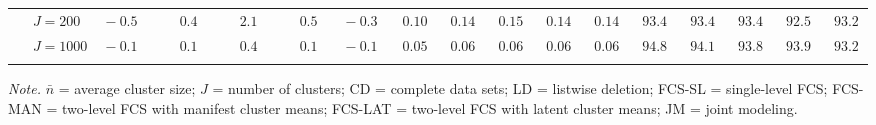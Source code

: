 \begin{sidewaystable}
\begin{threeparttable}
\begin{tabular}{llccccccccccccccc}
 & \nopagebreak $\;J=200$  & $\phantom{0}{-}0.5\phantom{0}$ & $\phantom{0}\phantom{-}0.4\phantom{0}$ & $\phantom{0}\phantom{-}2.1\phantom{0}$ & $\phantom{0}\phantom{-}0.5\phantom{0}$ & $\phantom{0}{-}0.3\phantom{0}$ & $\phantom{0}0.10\phantom{0}$ & $\phantom{0}0.14\phantom{0}$ & $\phantom{0}0.15\phantom{0}$ & $\phantom{0}0.14\phantom{0}$ & $\phantom{0}0.14\phantom{0}$ & $\phantom{0}93.4\phantom{0}$ & $\phantom{0}93.4\phantom{0}$ & $\phantom{0}93.4\phantom{0}$ & $\phantom{0}92.5\phantom{0}$ & $\phantom{0}93.2\phantom{0}$ \\
 & \nopagebreak $\;J=1000$  & $\phantom{0}{-}0.1\phantom{0}$ & $\phantom{0}\phantom{-}0.1\phantom{0}$ & $\phantom{0}\phantom{-}0.4\phantom{0}$ & $\phantom{0}\phantom{-}0.1\phantom{0}$ & $\phantom{0}{-}0.1\phantom{0}$ & $\phantom{0}0.05\phantom{0}$ & $\phantom{0}0.06\phantom{0}$ & $\phantom{0}0.06\phantom{0}$ & $\phantom{0}0.06\phantom{0}$ & $\phantom{0}0.06\phantom{0}$ & $\phantom{0}94.8\phantom{0}$ & $\phantom{0}94.1\phantom{0}$ & $\phantom{0}93.8\phantom{0}$ & $\phantom{0}93.9\phantom{0}$ & $\phantom{0}93.2\phantom{0}$ \\
[0.5ex]\hline\\[-1.6ex] 
\end{tabular}
\begin{tablenotes}{\footnotesize \textit{Note.} $\bar{n}$ = average cluster size; $J$ = number of clusters; CD = complete data sets; LD = listwise deletion; FCS-SL = single-level FCS; FCS-MAN = two-level FCS with manifest cluster means; FCS-LAT = two-level FCS with latent cluster means; JM = joint modeling.}\end{tablenotes}
\end{threeparttable}
\end{sidewaystable}
